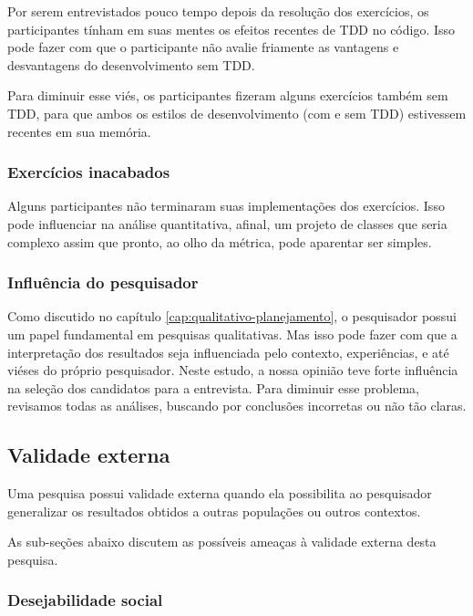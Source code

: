 \documentclass[conference]{IEEEtran}
\begin{document}
Por serem entrevistados pouco tempo depois da resolução dos exercícios, os participantes tínham
em suas mentes os efeitos recentes de TDD no código. Isso pode fazer com que o participante
não avalie friamente as vantagens e desvantagens do desenvolvimento sem TDD. 

Para diminuir esse viés, os participantes fizeram alguns exercícios também
sem TDD, para que ambos os estilos de desenvolvimento (com e sem TDD) estivessem
recentes em sua memória.

\subsubsection{Exercícios inacabados}

Alguns participantes não terminaram suas implementações dos exercícios. Isso
pode influenciar na análise quantitativa, afinal, um projeto de classes que
seria complexo assim que pronto, ao olho da métrica, pode aparentar ser simples.

\subsubsection{Influência do pesquisador}

Como discutido no capítulo \ref{cap:qualitativo-planejamento}, o pesquisador possui
um papel fundamental em pesquisas qualitativas. Mas isso pode fazer com que
a interpretação dos resultados seja influenciada pelo contexto, experiências,
e até viéses do próprio pesquisador.
Neste estudo, a nossa opinião teve forte influência na seleção dos candidatos
para a entrevista.
Para diminuir esse problema, revisamos todas as análises,
buscando por conclusões incorretas ou não tão claras. 

\subsection{Validade externa}

Uma pesquisa possui validade externa quando ela possibilita ao pesquisador 
generalizar os resultados obtidos a outras populações ou outros contextos.

As sub-seções abaixo discutem as possíveis ameaças à validade externa
desta pesquisa.

\subsubsection{Desejabilidade social}
\end{document}
